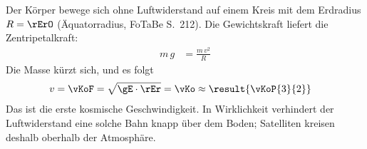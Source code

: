 Der Körper bewege sich ohne Luftwiderstand auf einem Kreis mit dem Erdradius $R = \rErO$ (Äquatorradius, FoTaBe S.~212). Die Gewichtskraft liefert die Zentripetalkraft:
\begin{align}
 m\,g &= \frac{m\,v^2}{R}
\end{align}
Die Masse kürzt sich, und es folgt
\begin{align}
 v &= \vKoF = \sqrt{\gE\cdot\rEr} = \vKo \approx \result{\vKoP{3}{2}}
\end{align}
Das ist die erste kosmische Geschwindigkeit. In Wirklichkeit verhindert der Luftwiderstand eine solche Bahn knapp über dem Boden; Satelliten kreisen deshalb oberhalb der Atmosphäre.
